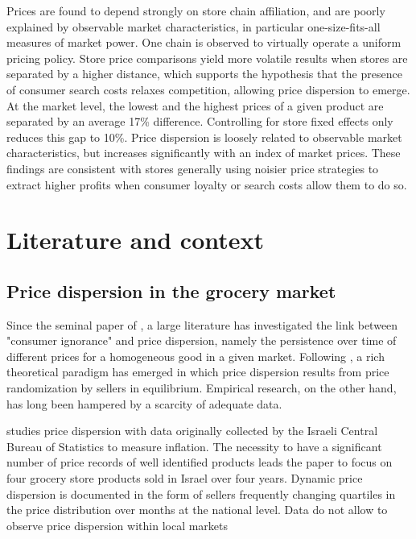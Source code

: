 \documentclass[english]{article}
\begin{document}
Prices are found to depend strongly on store chain affiliation, and are poorly explained by observable market characteristics, in particular one-size-fits-all measures of market power. One chain is observed to virtually operate a uniform pricing policy. Store price comparisons yield more volatile results when stores are separated by a higher distance, which supports the hypothesis that the presence of consumer search costs relaxes competition, allowing price dispersion to emerge. At the market level, the lowest and the highest prices of a given product are separated by an average 17\% difference. Controlling for store fixed effects only reduces this gap to 10\%. Price dispersion is loosely related to observable market characteristics, but increases significantly with an index of market prices. These findings are consistent with stores generally using noisier price strategies to extract higher profits when consumer loyalty or search costs allow them to do so.

\section{Literature and context}


\subsection{Price dispersion in the grocery market}

Since the seminal paper of \cite{STI61}, a large literature has investigated the link between "consumer ignorance" and price dispersion, namely the persistence over time of different prices for a homogeneous good in a given market. Following \cite{VAR80}, a rich theoretical paradigm has emerged in which price dispersion results from price randomization by sellers in equilibrium. Empirical research, on the other hand, has long been hampered by a scarcity of adequate data.

\cite{LAC02} studies price dispersion with data originally collected by the Israeli Central Bureau of Statistics to measure inflation. The necessity to have a significant number of price records of well identified products leads the paper to focus on four grocery store products sold in Israel over four years. Dynamic price dispersion is documented in the form of sellers frequently changing quartiles in the price distribution over months at the national level. Data do not allow to observe price dispersion within local markets
\end{document}
